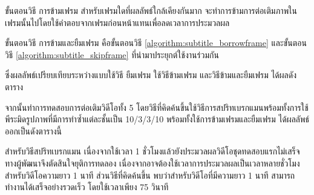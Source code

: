 \vspace{0.5cm}

\hspace{1cm}ขั้นตอนวิธี การข้ามเฟรม สำหรับเฟรมใดที่ผลลัพธ์ใกล้เคียงกันมาก จะทำการข้ามการต่อเติมภาพในเฟรมนั้นไปโดยใช้คำตอบจากเฟรมก่อนหน้าแทนเพื่อลดเวลาการประมวลผล \\ 
\vspace{0.5cm}

\vspace{0.5cm}
\hspace{1cm}ขั้นตอนวิธี การข้ามและยืมเฟรม คือขั้นตอนวิธี \ref{algorithm:subtitle_borrowframe} และขั้นตอนวิธี \ref{algorithm:subtitle_skipframe} ที่นำมาประยุกต์ใช้งานร่วมกัน\\
\vspace{0.5cm}

\vspace{0.5cm}
\hspace{1cm}ซึ่งผลลัพธ์เปรียบเทียบระหว่างแบบใช้วิธี ยืมเฟรม ใช้วิธีข้ามเฟรม และวิธีข้ามและยืมเฟรม ได้ผลดังตาราง


		
\hspace{1cm}  จากนั้นทำการทดสอบการต่อเติมวิดีโอทั้ง 5 โดยวิธีที่คิดค้นขึ้นใช้วิธีการสปริทเบรกแมนพร้อมทั้งการใช้พีระมิดรูปภาพที่มีการทำซ้ำแต่ละชั้นเป็น 10/3/3/10  พร้อมทั้งใช้การข้ามเฟรมและยืมเฟรม ได้ผลลัพธ์ออกเป็นดังตารางนี้



\hspace{1cm} สำหรับวิธีสปริทเบรกแมน เนื่องจากใช้เวลา 1 ชั่วโมงแล้วยังประมวลผลวิดีโอชุดทดสอบแรกไม่เสร็จ ทางผู้พัฒนาจึงตัดสินใจยุติการทดลอง เนื่องจากอาจต้องใช้เวลาการประมวลผลเป็นเวลาหลายชั่วโมงสำหรับวิดีโอความยาว 1 นาที ส่วนวิธีที่คิดค้นขึ้น พบว่าสำหรับวิดีโอที่มีความยาว 1 นาที สามารถทำงานได้เสร็จอย่างรวดเร็ว โดยใช้เวลาเพียง 75 วินาที